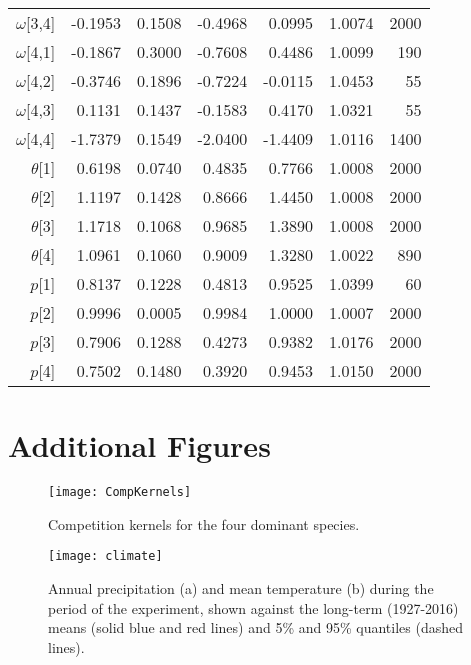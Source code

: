 \documentclass[11pt]{article}
\begin{document}
\begin{table}[ht]
\begin{tabular}{rrrrrrr}
  $\omega$[3,4] & -0.1953 & 0.1508 & -0.4968 & 0.0995 & 1.0074 &  2000 \\ 
  $\omega$[4,1] & -0.1867 & 0.3000 & -0.7608 & 0.4486 & 1.0099 &   190 \\ 
  $\omega$[4,2] & -0.3746 & 0.1896 & -0.7224 & -0.0115 & 1.0453 &    55 \\ 
  $\omega$[4,3] & 0.1131 & 0.1437 & -0.1583 & 0.4170 & 1.0321 &    55 \\ 
  $\omega$[4,4] & -1.7379 & 0.1549 & -2.0400 & -1.4409 & 1.0116 &  1400 \\ 
   $\theta$[1] & 0.6198 & 0.0740 & 0.4835 & 0.7766 & 1.0008 &  2000 \\ 
   $\theta$[2] & 1.1197 & 0.1428 & 0.8666 & 1.4450 & 1.0008 &  2000 \\ 
   $\theta$[3] & 1.1718 & 0.1068 & 0.9685 & 1.3890 & 1.0008 &  2000 \\ 
  $\theta$[4] & 1.0961 & 0.1060 & 0.9009 & 1.3280 & 1.0022 &   890 \\ 
  $p$[1] & 0.8137 & 0.1228 & 0.4813 & 0.9525 & 1.0399 &    60 \\ 
  $p$[2] & 0.9996 & 0.0005 & 0.9984 & 1.0000 & 1.0007 &  2000 \\ 
  $p$[3] & 0.7906 & 0.1288 & 0.4273 & 0.9382 & 1.0176 &  2000 \\ 
  $p$[4] & 0.7502 & 0.1480 & 0.3920 & 0.9453 & 1.0150 &  2000 \\ 
   \hline
\end{tabular}
\end{table}


\clearpage

\section{Additional Figures} 

 \begin{figure}[h]
 \centering
 \texttt{[image: CompKernels]}
 \caption{Competition kernels for the four dominant species.  }
 \label{fig:CompKernels}
 \end{figure}
 
  \begin{figure}[h]
  \centering
  \texttt{[image: climate]}
  \caption{Annual precipitation (a) and mean temperature (b) during the period of the experiment, shown against the long-term (1927-2016) means (solid blue and red lines) and 5\% and 95\% quantiles (dashed lines).  }
  \label{fig:climate}
  \end{figure}
 
\end{document}
